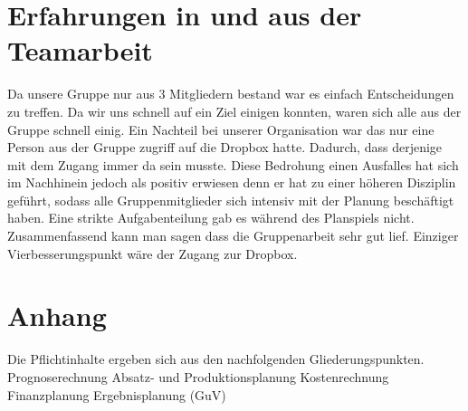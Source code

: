 \documentclass[a4paper, 12pt]{report}
\begin{document}
\begin{flushleft}
\chapter{Erfahrungen in und aus der Teamarbeit}
Da unsere Gruppe nur aus 3 Mitgliedern bestand war es einfach Entscheidungen zu treffen.
Da wir uns schnell auf ein Ziel einigen konnten, waren sich alle aus der Gruppe schnell einig.
Ein Nachteil bei unserer Organisation war das nur eine Person aus der Gruppe zugriff auf die Dropbox hatte.
Dadurch, dass derjenige mit dem Zugang immer da sein musste.
Diese Bedrohung einen Ausfalles hat sich im Nachhinein jedoch als positiv erwiesen denn er hat zu einer höheren Disziplin geführt, sodass alle Gruppenmitglieder sich intensiv mit der Planung beschäftigt haben.
Eine strikte Aufgabenteilung gab es während des Planspiels nicht.
Zusammenfassend kann man sagen dass die Gruppenarbeit sehr gut lief.
Einziger Vierbesserungspunkt wäre  der Zugang zur Dropbox. 

\chapter{Anhang}



Die Pflichtinhalte ergeben sich aus den nachfolgenden Gliederungspunkten.
Prognoserechnung
Absatz- und Produktionsplanung
Kostenrechnung
Finanzplanung
Ergebnisplanung (GuV)

%
%


%
 
%
%
%
%
%
%
%
%

 
 
 \listoffigures
 

\end{flushleft}
\end{document}
